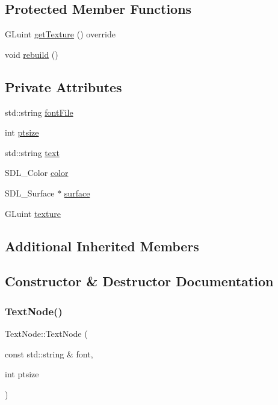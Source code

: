 \subsection*{Protected Member Functions}
\begin{DoxyCompactItemize}
\item 
G\+Luint \mbox{\hyperlink{classsage_1_1TextNode_ae21f17c6cb993692d8da89424b2581d7}{get\+Texture}} () override
\item 
void \mbox{\hyperlink{classsage_1_1TextNode_a7984e4a663f48338da018b780704b95f}{rebuild}} ()
\end{DoxyCompactItemize}
\subsection*{Private Attributes}
\begin{DoxyCompactItemize}
\item 
std\+::string \mbox{\hyperlink{classsage_1_1TextNode_a2e09c9e2e42c0c99ea24239aa09d03c9}{font\+File}}
\item 
int \mbox{\hyperlink{classsage_1_1TextNode_a1811c136026bea8ba6f27184e2d53c0c}{ptsize}}
\item 
std\+::string \mbox{\hyperlink{classsage_1_1TextNode_a2828e281a4ea3cce151de7cc983ca2c0}{text}}
\item 
S\+D\+L\+\_\+\+Color \mbox{\hyperlink{classsage_1_1TextNode_a08cbe2019a8aef4f1bd17a3f73a04d27}{color}}
\item 
S\+D\+L\+\_\+\+Surface $\ast$ \mbox{\hyperlink{classsage_1_1TextNode_a6f15575871c6eef0b1a461aaa1b87ca2}{surface}}
\item 
G\+Luint \mbox{\hyperlink{classsage_1_1TextNode_a8ffd1a92389ec216de154ea9a5b211cc}{texture}}
\end{DoxyCompactItemize}
\subsection*{Additional Inherited Members}


\subsection{Constructor \& Destructor Documentation}
\mbox{\label{classsage_1_1TextNode_a5fbde25db3407b5e5e84ef297821dec6}} 
\subsubsection{\texorpdfstring{TextNode()}{TextNode()}\hspace{0.1cm}{\footnotesize\ttfamily [1/3]}}
{\footnotesize\ttfamily Text\+Node\+::\+Text\+Node (\begin{DoxyParamCaption}\item[{const std\+::string \&}]{font,  }\item[{int}]{ptsize }\end{DoxyParamCaption})}

